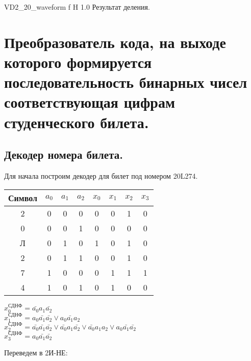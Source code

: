 \documentclass{bmstu}
\begin{document}
	{VD2_20_waveform}
	{f} %
	{H} %
	{1.0\textwidth} %
	{Результат деления.} %
	
	\chapter{Преобразователь кода, на выходе которого формируется
			 последовательность бинарных чисел соответствующая цифрам
			 студенческого билета.}
	
		\section{Декодер номера билета.}
	\begin{flushleft}
		Для начала построим декодер для билет под номером 20L274.
	\end{flushleft}
	
	\begin{center}
		\begin{tabular}{ |c||c|c|c||c|c|c|c| } 
			\hline
			Символ & $a_0$ & $a_1$ & $a_2$ & $x_0$ & $x_1$ & $x_2$ & $x_3$ \\
			\hline
			2 & 0 & 0 & 0 & 0 & 0 & 1 & 0 \\
			0 & 0 & 0 & 1 & 0 & 0 & 0 & 0 \\ 
			Л & 0 & 1 & 0 & 1 & 0 & 1 & 0 \\ 
			2 & 0 & 1 & 1 & 0 & 0 & 1 & 0 \\ 
			7 & 1 & 0 & 0 & 0 & 1 & 1 & 1 \\ 
			4 & 1 & 0 & 1 & 0 & 1 & 0 & 0 \\  
			\hline
		\end{tabular}
	\end{center}
	
	$x_0^{\text{СДНФ}} = \bar{a_0} a_1 \bar{a_2}$ \\
	$x_1^{\text{СДНФ}} = a_0 \bar{a_1} \bar{a_2} \vee a_0 \bar{a_1} a_2$ \\
	$x_2^{\text{СДНФ}} = \bar{a_0} \bar{a_1} \bar{a_2} \vee \bar{a_0} a_1 \bar{a_2} \vee \bar{a_0} a_1 a_2 \vee a_0 \bar{a_1} \bar{a_2}$ \\
	$x_3^{\text{СДНФ}} = a_0 \bar{a_1} \bar{a_2}$ \\
	
	\begin{flushleft}
		Переведем в 2И-НЕ: 
	\end{flushleft}
	
\end{document}
